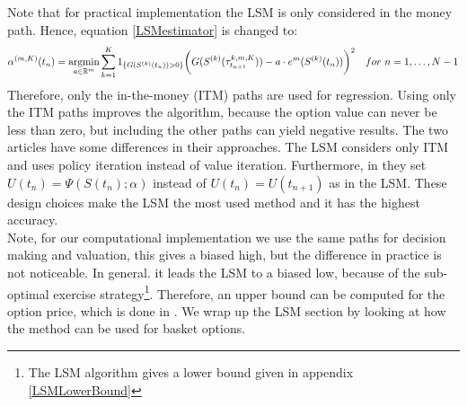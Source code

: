 Note that for practical implementation the LSM is only considered in the money path. Hence, equation \eqref{LSMestimator} is changed to:
\begin{equation*}
\alpha^{(m,K)}(t_n)= \operatorname*{argmin}_{a\in \mathbb{R}^m} \sum_{k=1}^{K} 1_{\{G(S^{(k)}(t_n))>0\}} \bigg(G(S^{(k)}(\tau^{k,m,K}_{t_{n+1}}))  -a \cdot e^m(S^{(k)}(t_{n})) \bigg)^2 \quad for \ n=1, \ldots, N-1
\end{equation*}
Therefore, only the in-the-money (ITM) paths are used for regression. Using only the ITM paths improves the algorithm, because the option value can never be less than zero, but including the other paths can yield negative results. The two articles \parencite{LSM, Tsitsiklis} have some differences in their approaches. The LSM considers only ITM and uses policy iteration instead of value iteration. Furthermore, in \parencite{Tsitsiklis} they set $U(t_n)= \Psi(S(t_n); \alpha)$ instead of $U(t_n)= U(t_{n+1})$ as in the LSM. These design choices make the LSM the most used method and it has the highest accuracy.\\

Note, for our computational implementation we use the same paths for decision making and valuation, this gives a biased high, but the difference in practice is not noticeable. In general. it leads the LSM to a biased low, because of the sub-optimal exercise strategy\footnote{The LSM algorithm gives a lower bound given in appendix \ref{LSMLowerBound}}. Therefore, an upper bound can be computed for the option price, which is done in \parencite{AndersenLeif2004}. We wrap up the LSM section by looking at how the method can be used for basket options.

